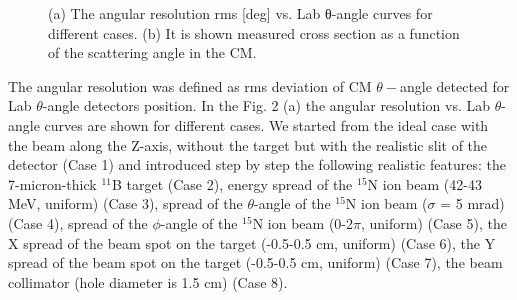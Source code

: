 \documentclass[%
 aip,
cp,  %
 amsmath,amssymb,%
 reprint,%
]{revtex4-2}
\begin{document}
\begin{figure}[h!]
\begin{minipage}[h]{0.45\linewidth}
\end{minipage}
\hfill
\begin{minipage}[h]{0.45\linewidth}
\end{minipage}
\vspace{0.05cm}
\caption{(a) The angular resolution rms [deg] vs. Lab θ-angle curves for different cases. (b)  It is shown measured cross section as a function of the scattering angle in the CM. }
\label{ris:fig1}
\end{figure}

The angular resolution was defined as rms deviation of CM $\theta-$angle detected for Lab $\theta$-angle detectors position.
In the Fig. 2 (a) the angular resolution vs. Lab $\theta$-angle curves are shown for different cases. We started from the ideal case with the beam along the Z-axis, without the target but with the realistic slit of the detector (Case 1) and introduced step by step the following realistic features: the 7-micron-thick ${}^{11}$B target (Case 2), energy spread of the ${}^{15}$N ion beam (42-43 MeV, uniform) (Case 3), spread of the $\theta$-angle of the ${}^{15}$N ion beam ($\sigma$ = 5 mrad) (Case 4),  spread of the $\phi$-angle of the ${}^{15}$N ion beam (0-2$\pi$, uniform) (Case 5), the X spread of the beam spot on the target (-0.5-0.5 cm, uniform) (Case 6), the Y spread of the beam spot on the target (-0.5-0.5 cm, uniform) (Case 7), the beam collimator (hole diameter is 1.5 cm)  (Case 8).
\end{document}
